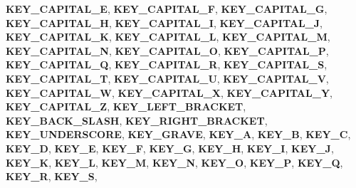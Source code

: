 \begin{DoxyCompactItemize}
{\bfseries K\+E\+Y\+\_\+\+C\+A\+P\+I\+T\+A\+L\+\_\+E}, 
{\bfseries K\+E\+Y\+\_\+\+C\+A\+P\+I\+T\+A\+L\+\_\+F}, 
{\bfseries K\+E\+Y\+\_\+\+C\+A\+P\+I\+T\+A\+L\+\_\+G}, 
\newline
{\bfseries K\+E\+Y\+\_\+\+C\+A\+P\+I\+T\+A\+L\+\_\+H}, 
{\bfseries K\+E\+Y\+\_\+\+C\+A\+P\+I\+T\+A\+L\+\_\+I}, 
{\bfseries K\+E\+Y\+\_\+\+C\+A\+P\+I\+T\+A\+L\+\_\+J}, 
{\bfseries K\+E\+Y\+\_\+\+C\+A\+P\+I\+T\+A\+L\+\_\+K}, 
\newline
{\bfseries K\+E\+Y\+\_\+\+C\+A\+P\+I\+T\+A\+L\+\_\+L}, 
{\bfseries K\+E\+Y\+\_\+\+C\+A\+P\+I\+T\+A\+L\+\_\+M}, 
{\bfseries K\+E\+Y\+\_\+\+C\+A\+P\+I\+T\+A\+L\+\_\+N}, 
{\bfseries K\+E\+Y\+\_\+\+C\+A\+P\+I\+T\+A\+L\+\_\+O}, 
\newline
{\bfseries K\+E\+Y\+\_\+\+C\+A\+P\+I\+T\+A\+L\+\_\+P}, 
{\bfseries K\+E\+Y\+\_\+\+C\+A\+P\+I\+T\+A\+L\+\_\+Q}, 
{\bfseries K\+E\+Y\+\_\+\+C\+A\+P\+I\+T\+A\+L\+\_\+R}, 
{\bfseries K\+E\+Y\+\_\+\+C\+A\+P\+I\+T\+A\+L\+\_\+S}, 
\newline
{\bfseries K\+E\+Y\+\_\+\+C\+A\+P\+I\+T\+A\+L\+\_\+T}, 
{\bfseries K\+E\+Y\+\_\+\+C\+A\+P\+I\+T\+A\+L\+\_\+U}, 
{\bfseries K\+E\+Y\+\_\+\+C\+A\+P\+I\+T\+A\+L\+\_\+V}, 
{\bfseries K\+E\+Y\+\_\+\+C\+A\+P\+I\+T\+A\+L\+\_\+W}, 
\newline
{\bfseries K\+E\+Y\+\_\+\+C\+A\+P\+I\+T\+A\+L\+\_\+X}, 
{\bfseries K\+E\+Y\+\_\+\+C\+A\+P\+I\+T\+A\+L\+\_\+Y}, 
{\bfseries K\+E\+Y\+\_\+\+C\+A\+P\+I\+T\+A\+L\+\_\+Z}, 
{\bfseries K\+E\+Y\+\_\+\+L\+E\+F\+T\+\_\+\+B\+R\+A\+C\+K\+ET}, 
\newline
{\bfseries K\+E\+Y\+\_\+\+B\+A\+C\+K\+\_\+\+S\+L\+A\+SH}, 
{\bfseries K\+E\+Y\+\_\+\+R\+I\+G\+H\+T\+\_\+\+B\+R\+A\+C\+K\+ET}, 
{\bfseries K\+E\+Y\+\_\+\+U\+N\+D\+E\+R\+S\+C\+O\+RE}, 
{\bfseries K\+E\+Y\+\_\+\+G\+R\+A\+VE}, 
\newline
{\bfseries K\+E\+Y\+\_\+A}, 
{\bfseries K\+E\+Y\+\_\+B}, 
{\bfseries K\+E\+Y\+\_\+C}, 
{\bfseries K\+E\+Y\+\_\+D}, 
\newline
{\bfseries K\+E\+Y\+\_\+E}, 
{\bfseries K\+E\+Y\+\_\+F}, 
{\bfseries K\+E\+Y\+\_\+G}, 
{\bfseries K\+E\+Y\+\_\+H}, 
\newline
{\bfseries K\+E\+Y\+\_\+I}, 
{\bfseries K\+E\+Y\+\_\+J}, 
{\bfseries K\+E\+Y\+\_\+K}, 
{\bfseries K\+E\+Y\+\_\+L}, 
\newline
{\bfseries K\+E\+Y\+\_\+M}, 
{\bfseries K\+E\+Y\+\_\+N}, 
{\bfseries K\+E\+Y\+\_\+O}, 
{\bfseries K\+E\+Y\+\_\+P}, 
\newline
{\bfseries K\+E\+Y\+\_\+Q}, 
{\bfseries K\+E\+Y\+\_\+R}, 
{\bfseries K\+E\+Y\+\_\+S}, 

\end{DoxyCompactItemize}
